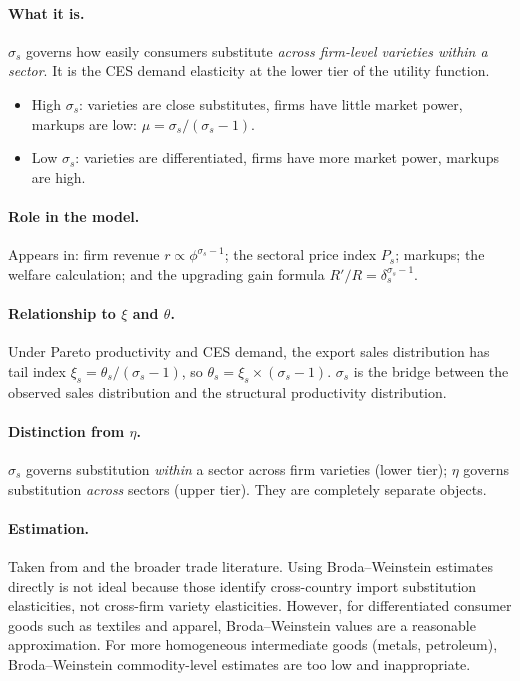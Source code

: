 \documentclass[12pt]{article}
\begin{document}
\paragraph{What it is.}
$\sigma_s$ governs how easily consumers substitute \emph{across firm-level
varieties within a sector}. It is the CES demand elasticity at the lower tier
of the utility function.
\begin{itemize}
  \item High $\sigma_s$: varieties are close substitutes, firms have little
        market power, markups are low: $\mu = \sigma_s/(\sigma_s - 1)$.
  \item Low $\sigma_s$: varieties are differentiated, firms have more market
        power, markups are high.
\end{itemize}

\paragraph{Role in the model.}
Appears in: firm revenue $r \propto \phi^{\sigma_s - 1}$; the sectoral price
index $P_s$; markups; the welfare calculation; and the upgrading gain formula
$R'/R = \delta_s^{\sigma_s - 1}$.

\paragraph{Relationship to $\xi$ and $\theta$.}
Under Pareto productivity and CES demand, the export sales distribution has
tail index $\xi_s = \theta_s / (\sigma_s - 1)$, so
$\theta_s = \xi_s \times (\sigma_s - 1)$.
$\sigma_s$ is the bridge between the observed sales distribution and the
structural productivity distribution.

\paragraph{Distinction from $\eta$.}
$\sigma_s$ governs substitution \emph{within} a sector across firm varieties
(lower tier); $\eta$ governs substitution \emph{across} sectors (upper tier).
They are completely separate objects.

\paragraph{Estimation.}
Taken from \citet{ImbsMejean2015} and the broader trade literature.
Using Broda--Weinstein estimates directly is not ideal because those identify
cross-country import substitution elasticities, not cross-firm variety
elasticities. However, for differentiated consumer goods such as
textiles and apparel, Broda--Weinstein values are a reasonable approximation.
For more homogeneous intermediate goods (metals, petroleum), Broda--Weinstein
commodity-level estimates are too low and inappropriate.
\end{document}

